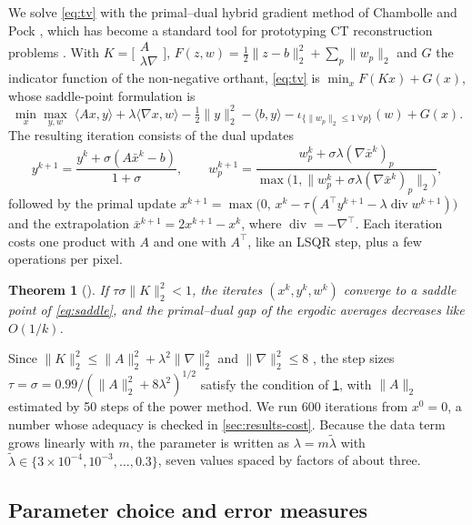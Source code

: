 \documentclass[11pt,a4paper]{article}
\numberwithin{equation}{section}
\newtheorem{theorem}[proposition]{Theorem}
\theoremstyle{remark}
\newcommand{\T}{\top}
\begin{document}
We solve \eqref{eq:tv} with the primal--dual hybrid gradient method of Chambolle and Pock \citep{chambolle2011}, which has become a standard tool for prototyping CT reconstruction problems \citep{sidky2012}. With $K=\bigl[\begin{smallmatrix}A\\ \lambda\nabla\end{smallmatrix}\bigr]$, $F(z,w)=\tfrac12\|z-b\|_2^2+\sum_p\|w_p\|_2$ and $G$ the indicator function of the non-negative orthant, \eqref{eq:tv} is $\min_x F(Kx)+G(x)$, whose saddle-point formulation is
\begin{equation}\label{eq:saddle}
  \min_{x}\max_{y,w}\;\langle Ax,y\rangle+\lambda\langle\nabla x,w\rangle-\tfrac12\|y\|_2^2-\langle b,y\rangle-\iota_{\{\|w_p\|_2\le1\ \forall p\}}(w)+G(x).
\end{equation}
The resulting iteration consists of the dual updates
\begin{equation}\label{eq:pdhg}
  y^{k+1}=\frac{y^k+\sigma(A\bar x^k-b)}{1+\sigma},\qquad
  w^{k+1}_p=\frac{w^k_p+\sigma\lambda(\nabla\bar x^k)_p}{\max\bigl(1,\|w^k_p+\sigma\lambda(\nabla\bar x^k)_p\|_2\bigr)},
\end{equation}
followed by the primal update $x^{k+1}=\max\bigl(0,\,x^k-\tau(A^\T y^{k+1}-\lambda\operatorname{div}w^{k+1})\bigr)$ and the extrapolation $\bar x^{k+1}=2x^{k+1}-x^k$, where $\operatorname{div}=-\nabla^\T$. Each iteration costs one product with $A$ and one with $A^\T$, like an LSQR step, plus a few operations per pixel.

\begin{theorem}[{\citep[Thm.~1]{chambolle2011}}]\label{thm:cp}
If $\tau\sigma\|K\|_2^2<1$, the iterates $(x^k,y^k,w^k)$ converge to a saddle point of \eqref{eq:saddle}, and the primal--dual gap of the ergodic averages decreases like $O(1/k)$.
\end{theorem}

Since $\|K\|_2^2\le\|A\|_2^2+\lambda^2\|\nabla\|_2^2$ and $\|\nabla\|_2^2\le8$ \citep{chambolle2004}, the step sizes $\tau=\sigma=0.99/(\|A\|_2^2+8\lambda^2)^{1/2}$ satisfy the condition of \cref{thm:cp}, with $\|A\|_2$ estimated by 50 steps of the power method. We run 600 iterations from $x^0=0$, a number whose adequacy is checked in \cref{sec:results-cost}. Because the data term grows linearly with $m$, the parameter is written as $\lambda=m\tilde\lambda$ with $\tilde\lambda\in\{3\times10^{-4},10^{-3},\dots,0.3\}$, seven values spaced by factors of about three.

\subsection{Parameter choice and error measures}\label{sec:methods-param}
\end{document}
